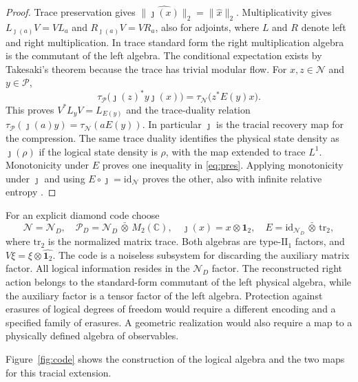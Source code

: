 \documentclass[11pt,a4paper]{article}
\numberwithin{equation}{section}
\theoremstyle{remark}
\newcommand{\N}{\mathcal N}
\newcommand{\Palg}{\mathcal P}
\newcommand{\C}{\mathbb C}
\newcommand{\one}{\mathbf 1}
\begin{document}
\begin{proof}
Trace preservation gives $\|\widehat{\jmath(x)}\|_2=\|\widehat x\|_2$. Multiplicativity gives $L_{\jmath(a)}V=VL_a$ and $R_{\jmath(a)}V=VR_a$, also for adjoints, where $L$ and $R$ denote left and right multiplication. In trace standard form the right multiplication algebra is the commutant of the left algebra. The conditional expectation exists by Takesaki's theorem because the trace has trivial modular flow. For $x,z\in\N$ and $y\in\Palg$,
\[
 \tau_{\Palg}\bigl(\jmath(z)^* y\jmath(x)\bigr)
   =\tau_{\N}\bigl(z^*E(y)x\bigr).
\]
This proves $V^*L_yV=L_{E(y)}$ and the trace-duality relation
$\tau_{\Palg}(\jmath(a)y)=\tau_{\N}(aE(y))$. In particular $\jmath$ is the tracial recovery map for the compression. The same trace duality identifies the physical state density as $\jmath(\rho)$ if the logical state density is $\rho$, with the map extended to trace $L^1$. Monotonicity under $E$ proves one inequality in \eqref{eq:pres}. Applying monotonicity under $\jmath$ and using $E\circ\jmath=\mathrm{id}_{\N}$ proves the other, also with infinite relative entropy \cite{Araki1976,Petz1988}.
\end{proof}

For an explicit diamond code choose
\begin{equation}
 \N=\N_D,\quad \Palg_D=\N_D\,\bar\otimes\,M_2(\C),\quad
 \jmath(x)=x\otimes\one_2,\quad
 E=\mathrm{id}_{\N_D}\,\bar\otimes\,\mathrm{tr}_2,
 \label{eq:example}
\end{equation}
where $\mathrm{tr}_2$ is the normalized matrix trace. Both algebras are type-$\mathrm{II}_1$ factors, and $V\xi=\xi\otimes\widehat{\one_2}$. The code is a noiseless subsystem for discarding the auxiliary matrix factor. All logical information resides in the $\N_D$ factor. The reconstructed right action belongs to the standard-form commutant of the left physical algebra, while the auxiliary factor is a tensor factor of the left algebra. Protection against erasures of logical degrees of freedom would require a different encoding and a specified family of erasures. A geometric realization would also require a map to a physically defined algebra of observables.

Figure~\ref{fig:code} shows the construction of the logical algebra and the two maps for this tracial extension.
\end{document}
